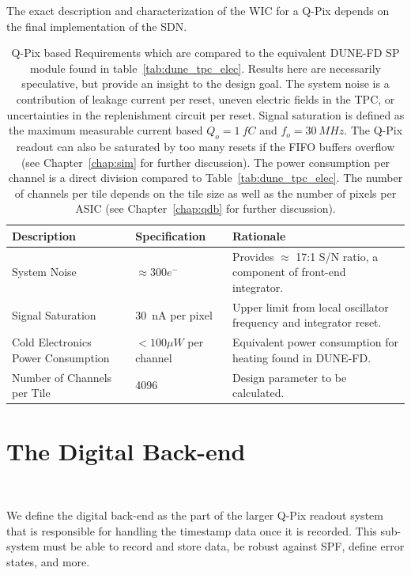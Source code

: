 The exact description and characterization of the WIC for a Q-Pix depends on the final implementation of the SDN.

\begin{table}
\begin{center}
\begin{tabular}{|| p{40mm} | p{40mm} | p{70mm} ||}
 \hline
 Description & Specification & Rationale \\ [0.5ex]
 \hline\hline
  System Noise & $\approx 300 e^{-}$ & Provides $\approx$ 17:1 S/N ratio, a component of front-end integrator. \\
 \hline
  Signal Saturation & 30~\unit{nA} per pixel & Upper limit from local oscillator frequency and integrator reset. \\
 \hline
  Cold Electronics Power Consumption &  $< 100 \unit{\mu W}$ per channel & Equivalent power consumption for heating found in DUNE-FD. \\
 \hline
  Number of Channels per Tile & 4096 &  Design parameter to be calculated. \\
 \hline
\end{tabular}
\caption{Q-Pix based Requirements which are compared to the equivalent DUNE-FD SP module found in table~\ref{tab:dune_tpc_elec}.
Results here are necessarily speculative, but provide an insight to the design goal.
The system noise is a contribution of leakage current per reset, uneven electric fields in the TPC, or uncertainties in the replenishment circuit per reset.
Signal saturation is defined as the maximum measurable current based $Q_{o} = 1~\unit{fC}$ and $f_{o} = 30~\unit{MHz}$.
The Q-Pix readout can also be saturated by too many resets if the FIFO buffers overflow (see Chapter~\ref{chap:sim} for further discussion).
The power consumption per channel is a direct division compared to Table~\ref{tab:dune_tpc_elec}.
The number of channels per tile depends on the tile size as well as the number of pixels per ASIC (see Chapter~\ref{chap:qdb} for further discussion).
}
\label{tab:qpix_tpc_elec}
\end{center}
\end{table}

\section{The Digital Back-end}~\label{sec:digital_back-end}

We define the digital back-end as the part of the larger Q-Pix readout system that is responsible for handling the timestamp data once it is recorded.
This sub-system must be able to record and store data, be robust against SPF, define error states, and more.

